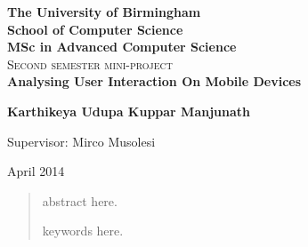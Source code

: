 \documentclass[12pt]{report}
\begin{document}
\begin{titlepage}
\begin{center}

\textbf{\LARGE The University of Birmingham}\\[0.35cm]
\textbf{\LARGE School of Computer Science}\\[0.35cm]
\textbf{\LARGE MSc in Advanced Computer Science}\\[2.5cm]

\textsc{\Large Second semester mini-project}\\[2.5cm]


{ \huge \bfseries  Analysing User Interaction On Mobile Devices \\[1cm] }

{\large \textbf{Karthikeya Udupa Kuppar Manjunath}\\[1cm]}

\large{Supervisor: Mirco Musolesi}


\vfill

{\large April 2014}

\end{center}
\end{titlepage}

\begin{abstract}

abstract here.
\linebreak\linebreak\linebreak\linebreak
\begin{center}
\begin{keywords}
keywords here.
\end{keywords}
\end{center}
\end{abstract}


\tableofcontents
\listoffigures
\listoftables
\newpage
\end{document}
